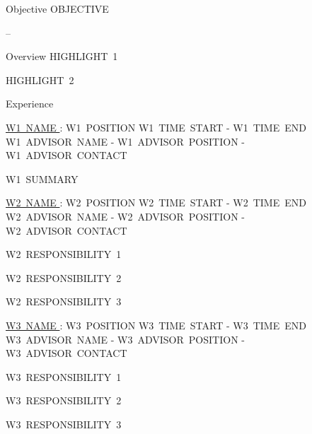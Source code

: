 \documentclass{resume} %
\begin{document}
  \begin{rSection}{Objective}
    OBJECTIVE
  \end{rSection}
  -- %

  \begin{rSection}{Overview}
    HIGHLIGHT~1

    HIGHLIGHT~2
  \end{rSection}

  \begin{rSection}{Experience}

    \begin{rSubsection}{\underline{W1~NAME }: W1~POSITION }{ W1~TIME~START - W1~TIME~END }{ W1~ADVISOR~NAME - W1~ADVISOR~POSITION - W1~ADVISOR~CONTACT }

      \item W1~SUMMARY

    \end{rSubsection}

    \begin{rSubsection}{\underline{W2~NAME }: W2~POSITION }{ W2~TIME~START - W2~TIME~END }{ W2~ADVISOR~NAME - W2~ADVISOR~POSITION - W2~ADVISOR~CONTACT }

      \item W2~RESPONSIBILITY~1

      \item W2~RESPONSIBILITY~2
      
      \item W2~RESPONSIBILITY~3

    \end{rSubsection}

    \begin{rSubsection}{\underline{W3~NAME }: W3~POSITION }{ W3~TIME~START - W3~TIME~END }{ W3~ADVISOR~NAME - W3~ADVISOR~POSITION - W3~ADVISOR~CONTACT }

      \item W3~RESPONSIBILITY~1

      \item W3~RESPONSIBILITY~2

      \item W3~RESPONSIBILITY~3

    \end{rSubsection}

  \end{rSection}
\end{document}
